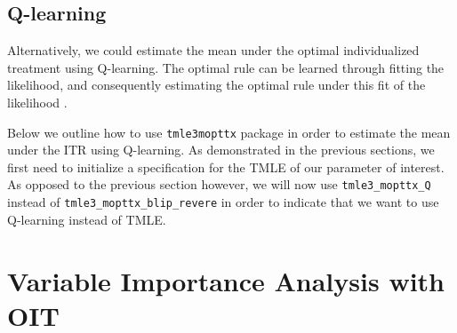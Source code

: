 \documentclass[12pt, krantz2,]{book}
\newenvironment{Shaded}{\begin{snugshade}}{\end{snugshade}}
\newcommand{\CommentTok}[1]{\textcolor[rgb]{0.56,0.35,0.01}{\textit{#1}}}
\newcommand{\DataTypeTok}[1]{\textcolor[rgb]{0.13,0.29,0.53}{#1}}
\newcommand{\DecValTok}[1]{\textcolor[rgb]{0.00,0.00,0.81}{#1}}
\newcommand{\KeywordTok}[1]{\textcolor[rgb]{0.13,0.29,0.53}{\textbf{#1}}}
\newcommand{\NormalTok}[1]{#1}
\newcommand{\OperatorTok}[1]{\textcolor[rgb]{0.81,0.36,0.00}{\textbf{#1}}}
\newcommand{\OtherTok}[1]{\textcolor[rgb]{0.56,0.35,0.01}{#1}}
\newcommand{\StringTok}[1]{\textcolor[rgb]{0.31,0.60,0.02}{#1}}
\theoremstyle{definition}
\theoremstyle{definition}
\theoremstyle{definition}
\newcommand{\1}{\mathbbm{1}}
\begin{document}
\hypertarget{q-learning}{%
\subsection{Q-learning}\label{q-learning}}

Alternatively, we could estimate the mean under the optimal individualized
treatment using Q-learning. The optimal rule can be learned through fitting the
likelihood, and consequently estimating the optimal rule under this fit of the
likelihood \citep[\citet{murphy2003}]{Sutton1998}.

Below we outline how to use \texttt{tmle3mopttx} package in order to estimate the mean
under the ITR using Q-learning. As demonstrated in the previous sections, we
first need to initialize a specification for the TMLE of our parameter of
interest. As opposed to the previous section however, we will now use
\texttt{tmle3\_mopttx\_Q} instead of \texttt{tmle3\_mopttx\_blip\_revere} in order to indicate that
we want to use Q-learning instead of TMLE.

\begin{Shaded}
\end{Shaded}

\hypertarget{variable-importance-analysis-with-oit}{%
\section{Variable Importance Analysis with OIT}\label{variable-importance-analysis-with-oit}}
\end{document}
